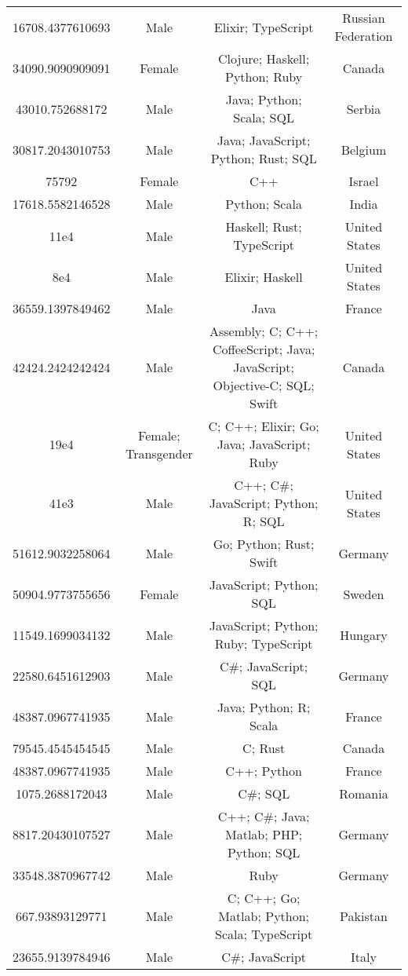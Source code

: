 \begin{center}
\begin{tabular}{ |c|c|c|c| }
16708.4377610693  &  Male  &  Elixir; TypeScript  &  Russian Federation  \\ 
34090.9090909091  &  Female  &  Clojure; Haskell; Python; Ruby  &  Canada  \\ 
43010.752688172  &  Male  &  Java; Python; Scala; SQL  &  Serbia  \\ 
30817.2043010753  &  Male  &  Java; JavaScript; Python; Rust; SQL  &  Belgium  \\ 
75792  &  Female  &  C++  &  Israel  \\ 
17618.5582146528  &  Male  &  Python; Scala  &  India  \\ 
11e4  &  Male  &  Haskell; Rust; TypeScript  &  United States  \\ 
8e4  &  Male  &  Elixir; Haskell  &  United States  \\ 
36559.1397849462  &  Male  &  Java  &  France  \\ 
42424.2424242424  &  Male  &  Assembly; C; C++; CoffeeScript; Java; JavaScript; Objective-C; SQL; Swift  &  Canada  \\ 
19e4  &  Female; Transgender  &  C; C++; Elixir; Go; Java; JavaScript; Ruby  &  United States  \\ 
41e3  &  Male  &  C++; C\#; JavaScript; Python; R; SQL  &  United States  \\ 
51612.9032258064  &  Male  &  Go; Python; Rust; Swift  &  Germany  \\ 
50904.9773755656  &  Female  &  JavaScript; Python; SQL  &  Sweden  \\ 
11549.1699034132  &  Male  &  JavaScript; Python; Ruby; TypeScript  &  Hungary  \\ 
22580.6451612903  &  Male  &  C\#; JavaScript; SQL  &  Germany  \\ 
48387.0967741935  &  Male  &  Java; Python; R; Scala  &  France  \\ 
79545.4545454545  &  Male  &  C; Rust  &  Canada  \\ 
48387.0967741935  &  Male  &  C++; Python  &  France  \\ 
1075.2688172043  &  Male  &  C\#; SQL  &  Romania  \\ 
8817.20430107527  &  Male  &  C++; C\#; Java; Matlab; PHP; Python; SQL  &  Germany  \\ 
33548.3870967742  &  Male  &  Ruby  &  Germany  \\ 
667.93893129771  &  Male  &  C; C++; Go; Matlab; Python; Scala; TypeScript  &  Pakistan  \\ 
23655.9139784946  &  Male  &  C\#; JavaScript  &  Italy  \\ 

\end{tabular}
\end{center}
